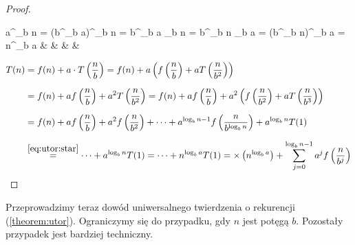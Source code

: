 \begin{proof}
	\begin{flalign} \label{eq:utor:star}
		a^{\log_b n} = \left(b^{\log_b a}\right)^{\log_b n} = b^{\log_b a \cdot \log_b n} = b^{\log_b n \cdot \log_b a} = \left(b^{\log_b n}\right)^{\log_b a} = n^{\log_b a} &  &  &  &
	\end{flalign}

	\begin{align*}
		T(n) & = f(n) + a\cdot T\left(\frac{n}{b}\right)
		= f(n) + a\left(f\left(\frac{n}{b}\right) + aT\left(\frac{n}{b^2}\right)\right)                                                                                   \\[1.5ex]
		     & = f(n) + af\left(\frac{n}{b}\right) + a^2 T\left(\frac{n}{b^2}\right)
		= f(n) + af\left(\frac{n}{b}\right) + a^2\left(f\left(\frac{n}{b^2}\right) + aT\left(\frac{n}{b^3}\right)\right)                                                  \\[1.5ex]
		     & = f(n) + af\left(\frac{n}{b}\right) + a^2 f\left(\frac{n}{b^2}\right) + \cdots + a^{\log_b n - 1} f\left(\frac{n}{b^{\log_b n}}\right) + a^{\log_b n} T(1) \\[1.5ex]
		     & \overset{\ref{eq:utor:star}}{=} \cdots + a^{\log_b n} T(1)
		= \cdots + n^{\log_b a} T(1)
		= \mathcal{\Theta}\left(n^{\log_b a}\right) + \sum_{j = 0}^{\log_b n - 1} a^j f\left(\frac{n}{b^j}\right)
	\end{align*}
\end{proof}

Przeprowadzimy teraz dowód uniwersalnego twierdzenia o rekurencji (\ref{theorem:utor}). Ograniczymy się do przypadku, gdy $n$ jest potęgą $b$. Pozostały przypadek jest bardziej techniczny.

